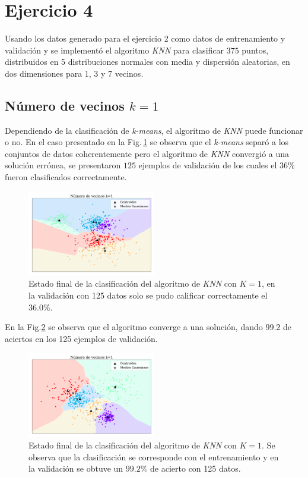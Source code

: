     \section*{Ejercicio 4}

    Usando los datos generado para el ejercicio  2 como datos de entrenamiento  y  validación y se implementó el algoritmo \emph{KNN} para clasificar $375$ puntos,   distribuidos en  5 distribuciones normales  con media y dispersión aleatorias, en dos dimensiones para 1, 3 y 7 vecinos. 

    \subsection*{Número de vecinos $k=1$}

    Dependiendo de la clasificación de \emph{k-means}, el algoritmo de \emph{KNN} puede funcionar o no. En el caso presentado en la Fig.\,\ref{fig:ejer4_k_1_malo} se observa que el \emph{k-means} separó a los conjuntos de datos coherentemente pero el algoritmo de \emph{KNN} convergió a  una solución errónea, se presentaron $125$ ejemplos de validación de los cuales el $36\%$ fueron clasificados correctamente.

    \begin{figure}[H]
    \centering
    \includegraphics[width=0.5\textwidth]{plots/ejer_4_K-1_no_coverge.pdf}
    \caption{Estado final de la clasificación del algoritmo de \emph{KNN} con $K=1$, en la validación con 125 datos solo se pudo calificar correctamente el 36.0\%.}
    \label{fig:ejer4_k_1_malo}
    \end{figure} 

    En la Fig.\ref{fig:ejer4_k_1} se observa que el algoritmo converge a una solución, dando $99.2$ de aciertos en los 125 ejemplos de validación.

\begin{figure}[H]
    \centering
    \includegraphics[width=0.5\textwidth]{plots/ejer_4_K-1_si_converge.pdf}
    \caption{Estado final de la clasificación del algoritmo de \emph{KNN} con $K=1$. Se observa que la clasificación se corresponde con el entrenamiento y en la validación se obtuve un $99.2\%$ de acierto con 125 datos.}
    \label{fig:ejer4_k_1}
\end{figure} 

